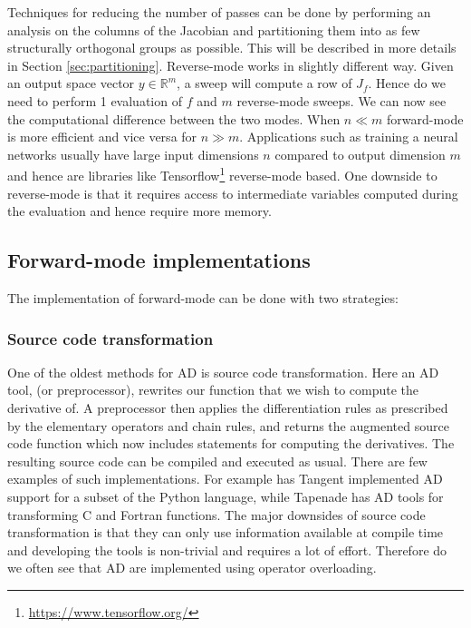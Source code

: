 Techniques for reducing the number of passes can be done by performing an analysis on the columns of the 
Jacobian and partitioning them into as few structurally orthogonal groups as possible. 
This will be described in more details in Section \ref{sec:partitioning}.
Reverse-mode works in slightly different way. Given an output space vector $y \in \mathbb{R}^m$, a sweep will compute a 
row of $J_f$. Hence do we need to perform 1 evaluation of $f$ and $m$ reverse-mode sweeps.  We can now see the 
computational difference between the two modes. When $n \ll m$ forward-mode is more efficient and vice versa for $n \gg m$. 
Applications such as training a neural networks usually have large input dimensions $n$ compared to output dimension $m$ and hence are 
libraries like Tensorflow\footnote{\url{https://www.tensorflow.org/}}  reverse-mode based. One downside to reverse-mode is that 
it requires access to intermediate variables computed during the evaluation and hence require more memory.  


\subsection{Forward-mode implementations}
The implementation of forward-mode can be done with two strategies:
\subsubsection*{Source code transformation}
One of the oldest methods for AD is source code transformation. Here an AD tool, (or preprocessor), rewrites our function that we wish to 
compute the derivative of. A preprocessor then applies the differentiation rules as prescribed by the elementary operators and chain rules, 
and returns the augmented source code function which now includes statements for computing the derivatives. The resulting source
code can be compiled and executed as usual. There are few examples of such implementations. 
For example has Tangent\cite{DBLP:journals/corr/abs-1711-02712} implemented AD support for a subset of the Python language, 
while Tapenade has AD tools for transforming C and Fortran functions. The major downsides of source code transformation is that 
they can only use information available at compile time and developing the tools is non-trivial and requires a lot of effort. 
Therefore do we often see that AD are implemented using operator overloading. 
	
